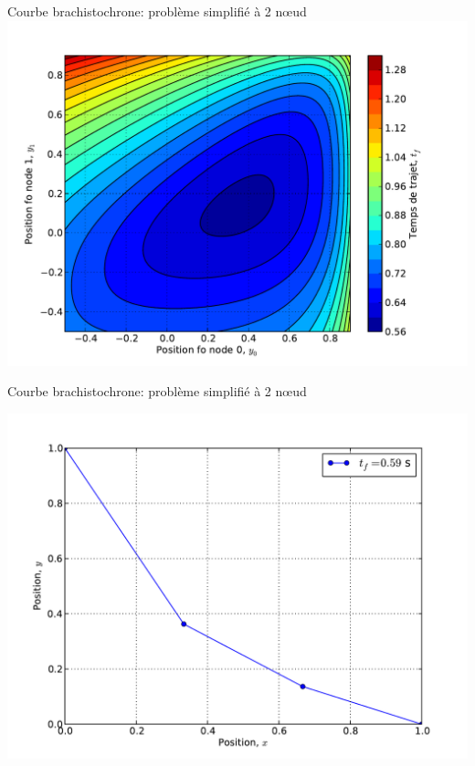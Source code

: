 \documentclass[8pt,a4paper]{beamer}
\begin{document}
\begin{frame}{Courbe brachistochrone: problème simplifié à 2 n\oe ud}
  \includegraphics[width = 1\textwidth]{figures/brachi2d.pdf}
\end{frame}

\begin{frame}{Courbe brachistochrone: problème simplifié à 2 n\oe ud}
  \begin{center}
    \includegraphics[width = 1.\textwidth]{figures/brachi2d_sol.pdf}
    
  \end{center}    


\end{frame}
\end{document}
